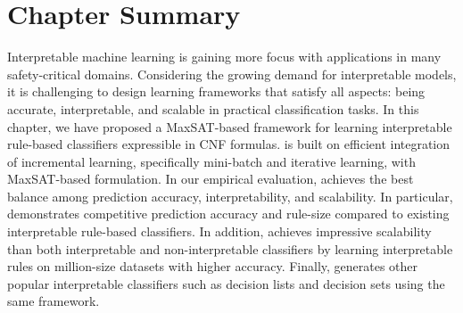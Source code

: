 
\section{Chapter Summary}
\label{interpretability_imli_sec:conclusion}
Interpretable machine learning is gaining more focus with applications in many safety-critical domains. Considering the growing demand for interpretable models, it is challenging to design learning frameworks that satisfy all aspects: being accurate, interpretable, and scalable in practical classification tasks.  In this chapter, we have proposed a MaxSAT-based framework {\imli} for learning interpretable rule-based classifiers expressible in CNF formulas. {\imli} is built on efficient integration of incremental learning, specifically mini-batch and iterative learning, with MaxSAT-based formulation.  In our empirical evaluation, {\imli} achieves the best balance among prediction accuracy, interpretability, and scalability. In particular, {\imli} demonstrates competitive prediction accuracy and rule-size compared to existing interpretable rule-based classifiers. In addition, {\imli} achieves impressive scalability than both interpretable and non-interpretable classifiers by learning interpretable rules on million-size datasets with higher accuracy.  Finally, {\imli}  generates other popular interpretable classifiers such as decision lists and decision sets using the same framework.


